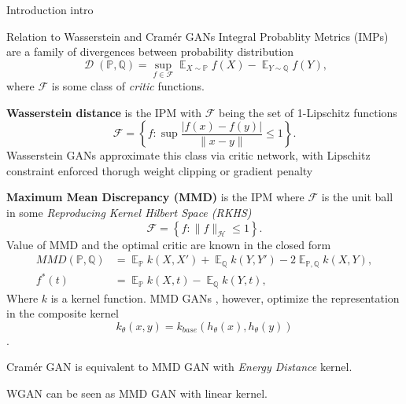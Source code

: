 \documentclass[xcolor={table}]{beamer}
\DeclareMathOperator{\D}{\mathcal{D}}
\DeclareMathOperator*{\E}{\mathbb{E}}
\newcommand{\F}{\mathcal{F}}
\newcommand{\h}{\mathcal{H}}
\newcommand{\PP}{\mathbb P}
\newcommand{\QQ}{\mathbb Q}
\begin{document}
\begin{frame}{}
\maketitle
\begin{columns}[T, totalwidth=\textwidth]

  \begin{column}{.32\textwidth}
    \begin{block}{Introduction}
    intro
    \end{block}

    \begin{block}{Relation to Wasserstein and Cram\'er GANs} 
      Integral Probablity Metrics (IMPs) are a family of divergences between 
      probability distribution
      \begin{equation}
        \D(\PP, \QQ) = \sup_{f\in\F} \E_{X\sim\PP}f(X) - \E_{Y\sim\QQ}f(Y),
      \end{equation}
      where $\F$ is some class of \emph{critic} functions. 
      \begin{itemize}
        \item{\textbf{Wasserstein distance} is the IPM with $\F$ being the set of 1-Lipschitz functions
          \[  
            \F = \left\{f: \sup\frac{|f(x) - f(y)|}{\|x - y\|}\leq 1\right\}. 
          \]
          Wasserstein GANs approximate this class via critic network, with Lipschitz 
          constraint enforced thorugh weight clipping \citep{wgan} or gradient 
          penalty \citep{wgan-gp}
        \item \textbf{Maximum Mean Discrepancy (MMD)} \citep{mmd-jmlr} is the IPM 
          where $\F$ is the unit ball in some 
          \emph{Reproducing Kernel Hilbert Space (RKHS)}
          \[ \F = \left\{f: \|f\|_{\h} \leq 1\right\}. \]
          Value of MMD and the optimal critic are known in the closed form
          \begin{align*}
            MMD(\PP, \QQ) &= \E_{\PP} k(X,X') + \E_{\QQ} k(Y,Y') - 2\E_{\PP,\QQ} k(X,Y),\\
            f^*(t) &= \E_{\PP}k(X, t) - \E_{\QQ}k(Y, t),
          \end{align*}
          Where $k$ is a kernel function. MMD GANs \citep{mmd-gan}, however, 
          optimize the representation in the composite kernel 
          \[ k_{\theta}(x, y) = k_{base}(h_{\theta}(x), h_{\theta}(y)) \].
        }
        \item Cram\'er GAN is equivalent to MMD GAN with \emph{Energy Distance} kernel.
        \item WGAN can be seen as  MMD GAN with linear kernel.
      \end{itemize}
    \end{block}
  \end{column}


\end{columns}
\end{frame}
\end{document}
